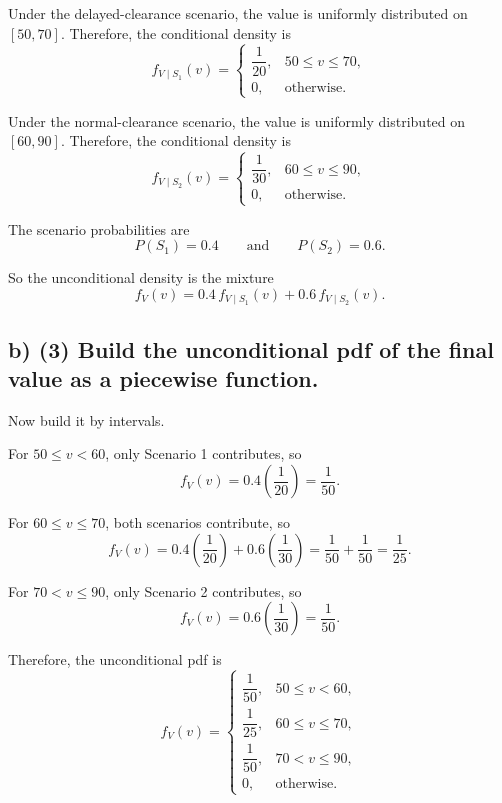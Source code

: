 	Under the delayed-clearance scenario, the value is uniformly distributed on $[50,70]$. Therefore, the conditional density is
	\[
	f_{V\mid S_1}(v)=
	\begin{cases}
		\dfrac{1}{20}, & 50\le v\le 70,\\[4pt]
		0, & \text{otherwise.}
	\end{cases}
	\]
	
	Under the normal-clearance scenario, the value is uniformly distributed on $[60,90]$. Therefore, the conditional density is
	\[
	f_{V\mid S_2}(v)=
	\begin{cases}
		\dfrac{1}{30}, & 60\le v\le 90,\\[4pt]
		0, & \text{otherwise.}
	\end{cases}
	\]
	
	The scenario probabilities are
	\[
	P(S_1)=0.4
	\qquad \text{and} \qquad
	P(S_2)=0.6.
	\]
	
	So the unconditional density is the mixture
	\[
	f_V(v)=0.4\,f_{V\mid S_1}(v)+0.6\,f_{V\mid S_2}(v).
	\]
	
	
	\subsection*{b) \textbf{(3)} Build the unconditional pdf of the final value as a piecewise function.}
	\label{subsec:two-scenario-inventory-investment-c2-b}
	Now build it by intervals.
	
	For $50\le v<60$, only Scenario 1 contributes, so
	\[
	f_V(v)=0.4\left(\frac{1}{20}\right)=\frac{1}{50}.
	\]
	
	For $60\le v\le 70$, both scenarios contribute, so
	\[
	f_V(v)=0.4\left(\frac{1}{20}\right)+0.6\left(\frac{1}{30}\right)
	=\frac{1}{50}+\frac{1}{50}
	=\frac{1}{25}.
	\]
	
	For $70<v\le 90$, only Scenario 2 contributes, so
	\[
	f_V(v)=0.6\left(\frac{1}{30}\right)=\frac{1}{50}.
	\]
	
	Therefore, the unconditional pdf is
	\[
	f_V(v)=
	\begin{cases}
		\dfrac{1}{50}, & 50\le v<60,\\[6pt]
		\dfrac{1}{25}, & 60\le v\le 70,\\[6pt]
		\dfrac{1}{50}, & 70<v\le 90,\\[6pt]
		0, & \text{otherwise.}
	\end{cases}
	\]
	
